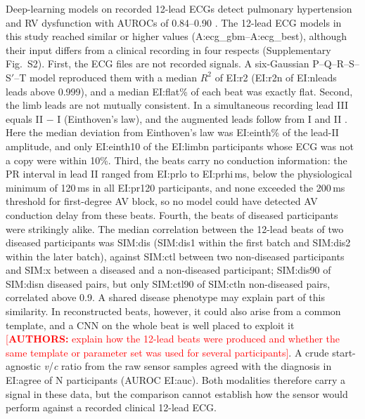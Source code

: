 \documentclass[11pt]{article}
\newcommand{\authnote}[1]{\textcolor{red}{[\textbf{AUTHORS:} #1]}}
\begin{document}
Deep-learning models on recorded 12-lead ECGs detect pulmonary hypertension and RV dysfunction with AUROCs of 0.84--0.90 \cite{kwon2020artificial,aras2023electrocardiogram,vaid2022using}. The 12-lead ECG models in this study reached similar or higher values ({{A:ecg_gbm}}--{{A:ecg_best}}), although their input differs from a clinical recording in four respects (Supplementary Fig.~S2). First, the ECG files are not recorded signals. A six-Gaussian P--Q--R--S--S$'$--T model reproduced them with a median $R^2$ of {{EI:r2}} ({{EI:r2n}} of {{EI:nleads}} leads above 0.999), and a median {{EI:flat}}\% of each beat was exactly flat. Second, the limb leads are not mutually consistent. In a simultaneous recording lead III equals II $-$ I (Einthoven's law), and the augmented leads follow from I and II \cite{goldberger1942simple}. Here the median deviation from Einthoven's law was {{EI:einth}}\% of the lead-II amplitude, and only {{EI:einth10}} of the {{EI:limbn}} participants whose ECG was not a copy were within 10\%. Third, the beats carry no conduction information: the PR interval in lead II ranged from {{EI:prlo}} to {{EI:prhi}}\,ms, below the physiological minimum of 120\,ms in all {{EI:pr120}} participants, and none exceeded the 200\,ms threshold for first-degree AV block, so no model could have detected AV conduction delay from these beats. Fourth, the beats of diseased participants were strikingly alike. The median correlation between the 12-lead beats of two diseased participants was {{SIM:dis}} ({{SIM:dis1}} within the first batch and {{SIM:dis2}} within the later batch), against {{SIM:ctl}} between two non-diseased participants and {{SIM:x}} between a diseased and a non-diseased participant; {{SIM:dis90}} of {{SIM:disn}} diseased pairs, but only {{SIM:ctl90}} of {{SIM:ctln}} non-diseased pairs, correlated above 0.9. A shared disease phenotype may explain part of this similarity. In reconstructed beats, however, it could also arise from a common template, and a CNN on the whole beat is well placed to exploit it \authnote{explain how the 12-lead beats were produced and whether the same template or parameter set was used for several participants}. A crude start-agnostic \textit{v}/\textit{c} ratio from the raw sensor samples agreed with the diagnosis in {{EI:agree}} of {{N}} participants (AUROC {{EI:auc}}). Both modalities therefore carry a signal in these data, but the comparison cannot establish how the sensor would perform against a recorded clinical 12-lead ECG.


\end{document}
